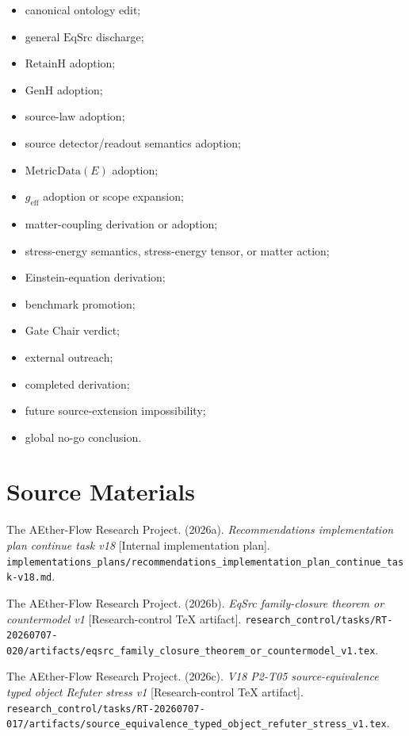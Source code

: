 \documentclass[11pt]{article}
\newcommand{\EqSrc}{\mathrm{EqSrc}}
\newcommand{\RetainH}{\mathrm{RetainH}}
\newcommand{\GenH}{\mathrm{GenH}}
\begin{document}
\begin{itemize}[leftmargin=*]
  \item canonical ontology edit;
  \item general \(\EqSrc\) discharge;
  \item \(\RetainH\) adoption;
  \item \(\GenH\) adoption;
  \item source-law adoption;
  \item source detector/readout semantics adoption;
  \item \(\mathrm{MetricData}(E)\) adoption;
  \item \(g_{\mathrm{eff}}\) adoption or scope expansion;
  \item matter-coupling derivation or adoption;
  \item stress-energy semantics, stress-energy tensor, or matter action;
  \item Einstein-equation derivation;
  \item benchmark promotion;
  \item Gate Chair verdict;
  \item external outreach;
  \item completed derivation;
  \item future source-extension impossibility;
  \item global no-go conclusion.
\end{itemize}

\section{Source Materials}

The AEther-Flow Research Project. (2026a). \emph{Recommendations
implementation plan continue task v18} [Internal implementation plan].
\texttt{implementations\_plans/recommendations\_implementation\_plan\_continue\_task-v18.md}.

The AEther-Flow Research Project. (2026b). \emph{EqSrc family-closure theorem
or countermodel v1} [Research-control TeX artifact].
\texttt{research\_control/tasks/RT-20260707-020/artifacts/eqsrc\_family\_closure\_theorem\_or\_countermodel\_v1.tex}.

The AEther-Flow Research Project. (2026c). \emph{V18 P2-T05
source-equivalence typed object Refuter stress v1} [Research-control TeX
artifact].
\texttt{research\_control/tasks/RT-20260707-017/artifacts/source\_equivalence\_typed\_object\_refuter\_stress\_v1.tex}.
\end{document}
